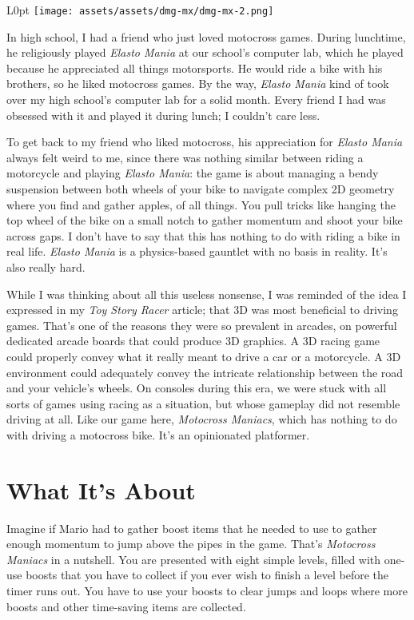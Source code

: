 \documentclass{book}
\begin{document}
\begin{wrapfigure}{L}{0pt} \texttt{[image: assets/assets/dmg-mx/dmg-mx-2.png]}\end{wrapfigure}
In high school, I had a friend who just loved motocross games. During lunchtime, he religiously played \emph{Elasto Mania} at our school’s computer lab, which he played because he appreciated all things motorsports. He would ride a bike with his brothers, so he liked motocross games. By the way, \emph{Elasto Mania} kind of took over my high school’s computer lab for a solid month. Every friend I had was obsessed with it and played it during lunch; I couldn’t care less.

To get back to my friend who liked motocross, his appreciation for \emph{Elasto Mania} always felt weird to me, since there was nothing similar between riding a motorcycle and playing \emph{Elasto Mania}: the game is about managing a bendy suspension between both wheels of your bike to navigate complex 2D geometry where you find and gather apples, of all things. You pull tricks like hanging the top wheel of the bike on a small notch to gather momentum and shoot your bike across gaps. I don’t have to say that this has nothing to do with riding a bike in real life. \emph{Elasto Mania} is a physics-based gauntlet with no basis in reality. It’s also really hard.

While I was thinking about all this useless nonsense, I was reminded of the idea I expressed in my \emph{Toy Story Racer} article; that 3D was most beneficial to driving games. That’s one of the reasons they were so prevalent in arcades, on powerful dedicated arcade boards that could produce 3D graphics. A 3D racing game could properly convey what it really meant to drive a car or a motorcycle. A 3D environment could adequately convey the intricate relationship between the road and your vehicle’s wheels. On consoles during this era, we were stuck with all sorts of games using racing as a situation, but whose gameplay did not resemble driving at all. Like our game here, \emph{Motocross Maniacs}, which has nothing to do with driving a motocross bike. It’s an opinionated platformer.

\FloatBarrier\needspace{10mm}\section*{What It’s About}\nopagebreak[4]

Imagine if Mario had to gather boost items that he needed to use to gather enough momentum to jump above the pipes in the game. That’s \emph{Motocross Maniacs} in a nutshell. You are presented with eight simple levels, filled with one-use boosts that you have to collect if you ever wish to finish a level before the timer runs out. You have to use your boosts to clear jumps and loops where more boosts and other time-saving items are collected.
\end{document}
